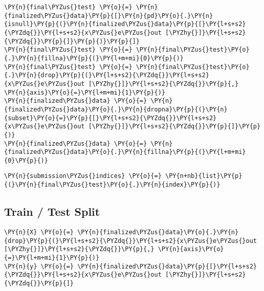     \begin{tcolorbox}[breakable, size=fbox, boxrule=1pt, pad at break*=1mm,colback=cellbackground, colframe=cellborder]
\begin{Verbatim}[commandchars=\\\{\}]
\PY{n}{final\PYZus{}test} \PY{o}{=} \PY{n}{finalized\PYZus{}data}\PY{p}{[}\PY{n}{pd}\PY{o}{.}\PY{n}{isnull}\PY{p}{(}\PY{n}{finalized\PYZus{}data}\PY{p}{[}\PY{l+s+s2}{\PYZdq{}}\PY{l+s+s2}{x\PYZus{}e\PYZus{}out [\PYZhy{}]}\PY{l+s+s2}{\PYZdq{}}\PY{p}{]}\PY{p}{)}\PY{p}{]}
\PY{n}{final\PYZus{}test} \PY{o}{=} \PY{n}{final\PYZus{}test}\PY{o}{.}\PY{n}{fillna}\PY{p}{(}\PY{l+m+mi}{0}\PY{p}{)}
\PY{n}{final\PYZus{}test} \PY{o}{=} \PY{n}{final\PYZus{}test}\PY{o}{.}\PY{n}{drop}\PY{p}{(}\PY{l+s+s2}{\PYZdq{}}\PY{l+s+s2}{x\PYZus{}e\PYZus{}out [\PYZhy{}]}\PY{l+s+s2}{\PYZdq{}}\PY{p}{,} \PY{n}{axis}\PY{o}{=}\PY{l+m+mi}{1}\PY{p}{)}
\PY{n}{finalized\PYZus{}data} \PY{o}{=} \PY{n}{finalized\PYZus{}data}\PY{o}{.}\PY{n}{dropna}\PY{p}{(}\PY{n}{subset}\PY{o}{=}\PY{p}{[}\PY{l+s+s2}{\PYZdq{}}\PY{l+s+s2}{x\PYZus{}e\PYZus{}out [\PYZhy{}]}\PY{l+s+s2}{\PYZdq{}}\PY{p}{]}\PY{p}{)}
\PY{n}{finalized\PYZus{}data} \PY{o}{=} \PY{n}{finalized\PYZus{}data}\PY{o}{.}\PY{n}{fillna}\PY{p}{(}\PY{l+m+mi}{0}\PY{p}{)}
\end{Verbatim}
\end{tcolorbox}

    \begin{tcolorbox}[breakable, size=fbox, boxrule=1pt, pad at break*=1mm,colback=cellbackground, colframe=cellborder]
\begin{Verbatim}[commandchars=\\\{\}]
\PY{n}{submission\PYZus{}indices} \PY{o}{=} \PY{n+nb}{list}\PY{p}{(}\PY{n}{final\PYZus{}test}\PY{o}{.}\PY{n}{index}\PY{p}{)}
\end{Verbatim}
\end{tcolorbox}

    \hypertarget{train-test-split}{%
\subsection{Train / Test Split}\label{train-test-split}}

    \begin{tcolorbox}[breakable, size=fbox, boxrule=1pt, pad at break*=1mm,colback=cellbackground, colframe=cellborder]
\begin{Verbatim}[commandchars=\\\{\}]
\PY{n}{X} \PY{o}{=} \PY{n}{finalized\PYZus{}data}\PY{o}{.}\PY{n}{drop}\PY{p}{(}\PY{l+s+s2}{\PYZdq{}}\PY{l+s+s2}{x\PYZus{}e\PYZus{}out [\PYZhy{}]}\PY{l+s+s2}{\PYZdq{}}\PY{p}{,} \PY{n}{axis}\PY{o}{=}\PY{l+m+mi}{1}\PY{p}{)}
\PY{n}{y} \PY{o}{=} \PY{n}{finalized\PYZus{}data}\PY{p}{[}\PY{l+s+s2}{\PYZdq{}}\PY{l+s+s2}{x\PYZus{}e\PYZus{}out [\PYZhy{}]}\PY{l+s+s2}{\PYZdq{}}\PY{p}{]}
\end{Verbatim}
\end{tcolorbox}

